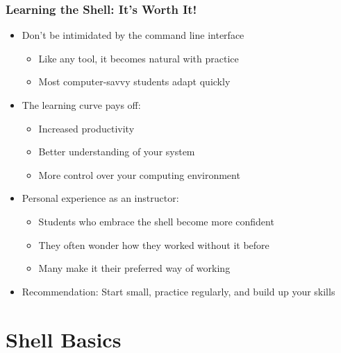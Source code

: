 \documentclass[10pt]{beamer}
\begin{document}
\begin{frame}
    \frametitle{Learning the Shell: It's Worth It!}
    \begin{itemize}
        \item Don't be intimidated by the command line interface
        \begin{itemize}
            \item Like any tool, it becomes natural with practice
            \item Most computer-savvy students adapt quickly
        \end{itemize}
        \item The learning curve pays off:
        \begin{itemize}
            \item Increased productivity
            \item Better understanding of your system
            \item More control over your computing environment
        \end{itemize}
        \item Personal experience as an instructor:
        \begin{itemize}
            \item Students who embrace the shell become more confident
            \item They often wonder how they worked without it before
            \item Many make it their preferred way of working
        \end{itemize}
        \item Recommendation: Start small, practice regularly, and build up your skills
    \end{itemize}
\end{frame}

\section{Shell Basics}
\end{document}
